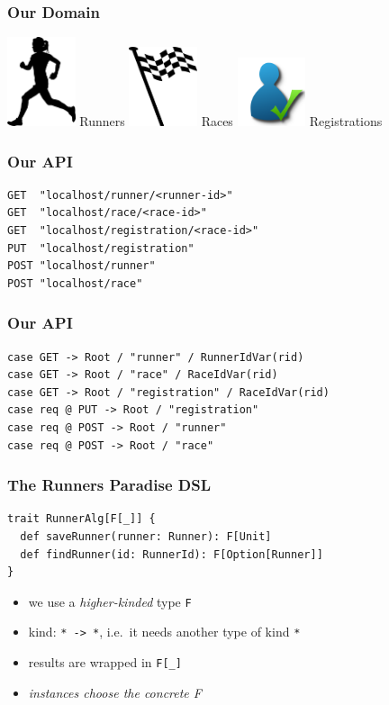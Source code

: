 \documentclass{beamer}
\begin{document}
\begin{frame}
  \frametitle{Our Domain}
  \begin{center}
    \huge
    \includegraphics[width=2cm]{pics/runner.png}
    Runners
    \includegraphics[width=2cm]{pics/race.png}
    Races
    \includegraphics[width=2cm]{pics/registration.png}
    Registrations
  \end{center}
\end{frame}

\begin{frame}[fragile]
  \frametitle{Our API}
\begin{verbatim}
GET  "localhost/runner/<runner-id>"
GET  "localhost/race/<race-id>"
GET  "localhost/registration/<race-id>"
PUT  "localhost/registration"
POST "localhost/runner"
POST "localhost/race"
\end{verbatim}
\end{frame}

\begin{frame}[fragile]
  \frametitle{Our API}
\begin{verbatim}
case GET -> Root / "runner" / RunnerIdVar(rid)
case GET -> Root / "race" / RaceIdVar(rid)
case GET -> Root / "registration" / RaceIdVar(rid)
case req @ PUT -> Root / "registration"
case req @ POST -> Root / "runner"
case req @ POST -> Root / "race"
\end{verbatim}
\end{frame}

\begin{frame}[fragile]
  \frametitle{The Runners Paradise DSL}
\begin{verbatim}
trait RunnerAlg[F[_]] {
  def saveRunner(runner: Runner): F[Unit]
  def findRunner(id: RunnerId): F[Option[Runner]]
}
\end{verbatim}
  \begin{itemize}
  \item we use a \textit{higher-kinded} type \texttt{F}
  \item kind: \texttt{* -> *}, i.e.\ it needs another type of kind
    \texttt{*}
  \item results are wrapped in \texttt{F[\_]}
  \item \textit{instances choose the concrete F}
  \end{itemize}
\end{frame}
\end{document}
